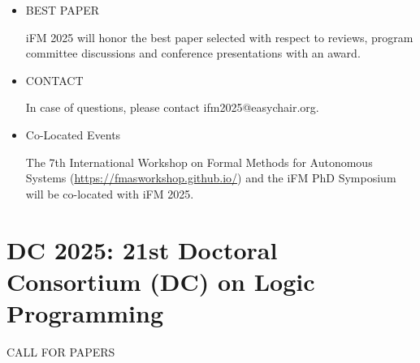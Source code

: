 \documentclass[prodmode,acmtecs]{acmsmall} %
\begin{document}
\begin{itemize}
\item  BEST PAPER   
 
  iFM 2025 will honor the best paper selected with respect to reviews, program committee discussions and conference presentations with an award. 
 
\item  CONTACT  
 
  In case of questions, please contact ifm2025@easychair.org. 
 
\item  Co-Located Events 
 
  The 7th International Workshop on Formal Methods for Autonomous Systems (\href{https://fmasworkshop.github.io/}{https://fmasworkshop.github.io/}) and the iFM PhD Symposium will be co-located with iFM 2025. 
 
\end{itemize}\section{DC 2025: 21st Doctoral Consortium (DC) on Logic Programming}\label{DC2025}CALL FOR PAPERS 
\end{document}
